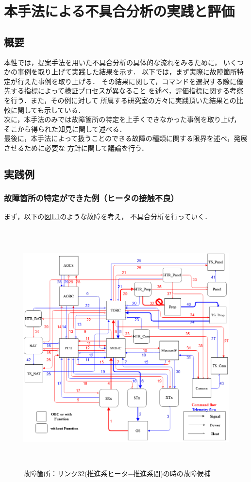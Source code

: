 \documentclass[11pt]{jsreport}
\begin{document}
\fi

\chapter{本手法による不具合分析の実践と評価}

\section{概要}
本性では，提案手法を用いた不具合分析の具体的な流れをみるために，
いくつかの事例を取り上げて実践した結果を示す．
以下では，まず実際に故障箇所特定が行えた事例を取り上げる．
その結果に関して，コマンドを選択する際に優先する指標によって検証プロセスが異なること
を述べ，評価指標に関する考察を行う．また，その例に対して
所属する研究室の方々に実践頂いた結果との比較に関しても示している．\\
次に，本手法のみでは故障箇所の特定を上手くできなかった事例を取り上げ，
そこから得られた知見に関して述べる．\\
最後に，本手法によって扱うことのできる故障の種類に関する限界を述べ，発展させるために必要な
方針に関して議論を行う．

\newpage
\section{実践例}
\subsection{故障箇所の特定ができた例（ヒータの接触不良）}
まず，以下の図\ref{fig:fault_mode1}のような故障を考え，
不具合分析を行っていく．\\
\begin{figure}[H]
   \centering
      \includegraphics[height=13.0cm]{figure/fault_mode1.png}
      \caption{故障箇所：リンク32(推進系ヒータ−推進系間)の時の故障候補}
      \label{fig:fault_mode1}
\end{figure}
\end{document}
